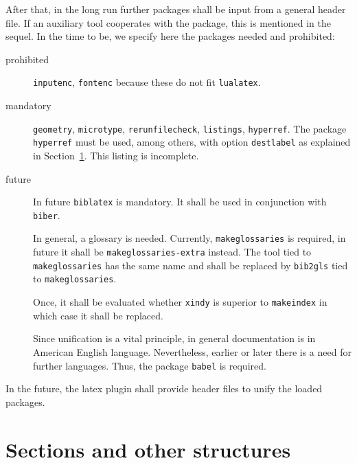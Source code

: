 \documentclass[a4paper,12pt]{article}
\begin{document}
After that, in the long run further packages shall be input from a general header file. 
If an auxiliary tool cooperates with the package, 
this is mentioned in the sequel. 
In the time to be, we specify here the packages needed and prohibited: 
%
\begin{description}
  \item[prohibited] 
  \texttt{inputenc}, 
  \texttt{fontenc} because these do not fit \texttt{lualatex}. 
  \item[mandatory] 
  \texttt{geometry}, \texttt{microtype}, \texttt{rerunfilecheck}, 
  \texttt{listings}, \texttt{hyperref}. 
  The package \texttt{hyperref} must be used, among others, with option \texttt{destlabel} 
  as explained in Section~\ref{sec:secs}. 
  This listing is incomplete. 
  \item[future] In future \texttt{biblatex} is mandatory. 
  It shall be used in conjunction with \texttt{biber}. 

  In general, a glossary is needed. Currently, \texttt{makeglossaries} is required, 
  in future it shall be \texttt{makeglossaries-extra} instead. 
  The tool tied to \texttt{makeglossaries} has the same name 
  and shall be replaced by \texttt{bib2gls} tied to \texttt{makeglossaries}. 

  Once, it shall be evaluated whether \texttt{xindy} is superior to \texttt{makeindex} 
  in which case it shall be replaced. 

  Since unification is a vital principle, in general documentation is in American English language. 
  Nevertheless, earlier or later there is a need for further languages. 
  Thus, the package \texttt{babel} is required. 
\end{description}

In the future, the latex plugin shall provide header files to unify the loaded packages. 


\section{Sections and other structures}\label{sec:secs}
\end{document}
